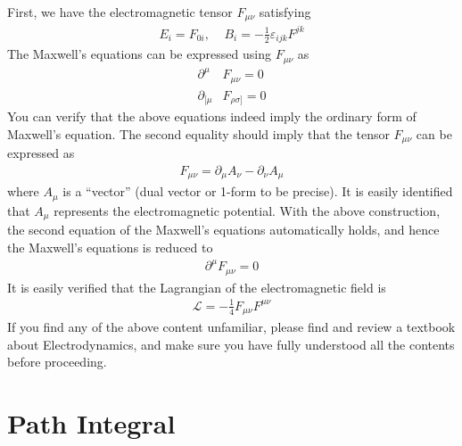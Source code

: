 \documentclass[letterpaper,10pt,english]{sphinxmanual}
\begin{document}
First, we have the electromagnetic tensor \(F_{\mu\nu}\) satisfying
\begin{equation*}
\begin{split}E_i = F_{0i}, \ \ \ \ \ B_i = -\frac{1}{2}\varepsilon_{ijk}F^{jk}\end{split}
\end{equation*}
The Maxwell’s equations can be expressed using \(F_{\mu\nu}\) as
\begin{equation*}
\begin{split}\partial^\mu &F_{\mu\nu} = 0\\
\partial_{[\mu} &F_{\rho\sigma]} = 0\end{split}
\end{equation*}
You can verify that the above equations indeed imply the ordinary form of Maxwell’s equation. The second equality should imply that the tensor \(F_{\mu\nu}\) can be expressed as
\begin{equation*}
\begin{split}F_{\mu\nu} = \partial_\mu A_\nu - \partial_\nu A_\mu\end{split}
\end{equation*}
where \(A_\mu\) is a “vector” (dual vector or 1-form to be precise). It is easily identified that \(A_\mu\) represents the electromagnetic potential. With the above construction, the second equation of the Maxwell’s equations automatically holds, and hence the Maxwell’s equations is reduced to
\begin{equation*}
\begin{split}\partial^\mu F_{\mu\nu} = 0\end{split}
\end{equation*}
It is easily verified that the Lagrangian of the electromagnetic field is
\begin{equation*}
\begin{split}\mathcal{L} = -\frac{1}{4}F_{\mu\nu}F^{\mu\nu}\end{split}
\end{equation*}
If you find any of the above content unfamiliar, please find and review a textbook about Electrodynamics, and make sure you have fully understood all the contents before proceeding.


\chapter{Path Integral}
\label{\detokenize{pathintgl::doc}}\label{\detokenize{pathintgl:path-integral}}
\end{document}
